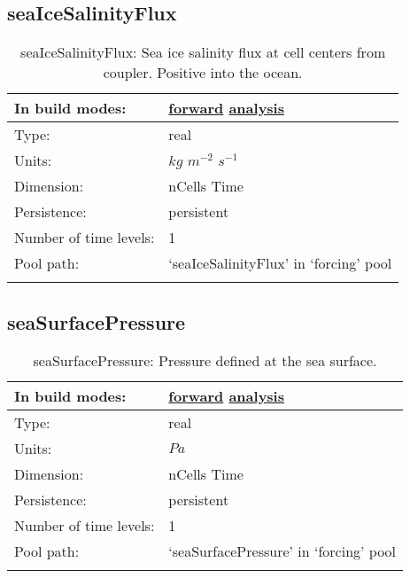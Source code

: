 \subsection[seaIceSalinityFlux]{seaIceSalinityFlux}
\label{subsec:var_sec_forcing_seaIceSalinityFlux}
\begin{center}
\begin{longtable}{| p{2.0in} | p{4.0in} |}
        \hline 
        In build modes: & \hyperref[subsec:forward_var_tab_forcing]{forward} \hyperref[subsec:analysis_var_tab_forcing]{analysis} \\
        \hline 
        Type: & real \\
        \hline 
        Units: & $kg$ $m^{-2}$ $s^{-1}$ \\
        \hline 
        Dimension: & nCells Time \\
        \hline 
        Persistence: & persistent \\
        \hline 
        Number of time levels: & 1 \\
        \hline 
            Pool path: & `seaIceSalinityFlux' in `forcing' pool \\
		 \hline 
    \caption{seaIceSalinityFlux: Sea ice salinity flux at cell centers from coupler. Positive into the ocean.}
\end{longtable}
\end{center}
\subsection[seaSurfacePressure]{seaSurfacePressure}
\label{subsec:var_sec_forcing_seaSurfacePressure}
\begin{center}
\begin{longtable}{| p{2.0in} | p{4.0in} |}
        \hline 
        In build modes: & \hyperref[subsec:forward_var_tab_forcing]{forward} \hyperref[subsec:analysis_var_tab_forcing]{analysis} \\
        \hline 
        Type: & real \\
        \hline 
        Units: & $Pa$ \\
        \hline 
        Dimension: & nCells Time \\
        \hline 
        Persistence: & persistent \\
        \hline 
        Number of time levels: & 1 \\
        \hline 
            Pool path: & `seaSurfacePressure' in `forcing' pool \\
		 \hline 
    \caption{seaSurfacePressure: Pressure defined at the sea surface.}
\end{longtable}
\end{center}
